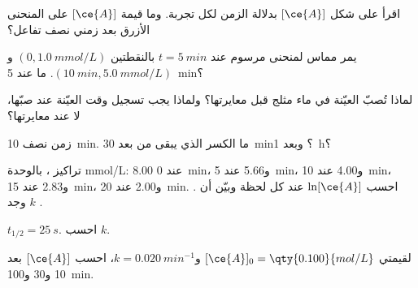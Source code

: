 \begin{exercise}[$\star$]\label{exo:g12:reaction-rates:2}
اقرأ على شكل $[\ce{A}]$ بدلالة الزمن  لكل تجربة.
وما قيمة $[\ce{A}]$ على المنحنى الأزرق بعد زمني نصف تفاعل؟
\end{exercise}

\begin{exercise}[$\star$]\label{exo:g12:reaction-rates:3}
يمر مماس لمنحنى  مرسوم عند $t = \qty{5}{min}$
بالنقطتين $(0, \qty{1.0}{mmol/L})$ و$(\qty{10}{min}, \qty{5.0}{mmol/L})$.
ما   عند \qty{5}{min}؟
\end{exercise}

\begin{exercise}[$\star$]\label{exo:g12:reaction-rates:4}
لماذا تُصبّ العيّنة في ماء مثلج قبل معايرتها؟ ولماذا
يجب تسجيل وقت العيّنة عند صبّها، لا عند
معايرتها؟
\end{exercise}

\begin{exercise}[$\star$]\label{exo:g12:reaction-rates:5}
زمن نصف  \qty{10}{min}. ما الكسر الذي
يبقى من  بعد \qty{30}{min}؟ وبعد \qty{1}{h}؟
\end{exercise}

\begin{exercise}[$\star\star$]\label{exo:g12:reaction-rates:6}
تراكيز ، بالوحدة \si{mmol/L}: 8.00 عند \qty{0}{min}، و5.66
عند \qty{5}{min}، و4.00 عند \qty{10}{min}، و2.83 عند \qty{15}{min}، و2.00 عند
\qty{20}{min}. احسب $\ln[\ce{A}]$ عند كل لحظة وبيّن أن
. وجد $k$ .
\end{exercise}

\begin{exercise}[$\star\star$]\label{exo:g12:reaction-rates:7}
 $t_{1/2} = \qty{25}{s}$. احسب $k$.
\end{exercise}

\begin{exercise}[$\star\star$]\label{exo:g12:reaction-rates:8}
لقيمتي $[\ce{A}]_0 = \qty{0.100}{mol/L}$ و$k = \qty{0.020}{min^{-1}}$،
احسب $[\ce{A}]$ بعد 10 و30 و\qty{100}{min}.
\end{exercise}

